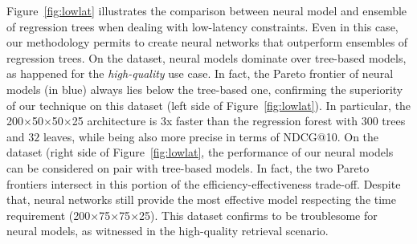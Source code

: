 Figure~\ref{fig:lowlat} illustrates the comparison between neural model and ensemble of regression trees when dealing with low-latency constraints. Even in this case, our methodology permits to create neural networks that  outperform ensembles of regression trees. On the \msn dataset, neural models dominate over tree-based models, as happened for the \textit{high-quality} use case. In fact,  the Pareto frontier of neural models (in blue) always lies below the tree-based one, confirming the superiority of our technique on this dataset (left side of Figure~\ref{fig:lowlat}). In particular, the 200$\times$50$\times$50$\times$25 architecture is $3$x faster than the regression forest with $300$ trees and $32$ leaves, while being also more precise in terms of NDCG@10. On the \istella dataset (right side of Figure~\ref{fig:lowlat}, the performance of our neural models can be considered on pair with tree-based models. In fact, the two Pareto frontiers intersect in this portion of the efficiency-effectiveness trade-off. Despite that, neural networks  still provide the most effective model respecting the time requirement (200$\times$75$\times$75$\times$25). 
This dataset confirms to be troublesome for neural models, as witnessed in the high-quality retrieval scenario. 



